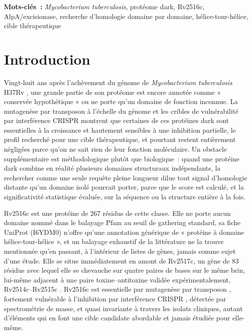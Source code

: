 \documentclass[11pt,a4paper]{article}
\newcommand{\mtb}{\textit{Mycobacterium tuberculosis}}
\begin{document}
\textbf{Mots-cl\'es~:} \textit{Mycobacterium tuberculosis}, protéome dark, Rv2516c, AlpA/excisionase,
recherche d'homologie domaine par domaine, hélice-tour-hélice, cible thérapeutique

\section{Introduction}

Vingt-huit ans après l'achèvement du génome de \mtb{} H37Rv \citep{cole1998genome}, une grande
partie de son protéome est encore annotée comme « conservée hypothétique » ou ne porte qu'un
domaine de fonction inconnue. La mutagenèse par transposon à l'échelle du génome
\citep{dejesus2017essentiality} et les cribles de vulnérabilité par interférence CRISPR
\citep{bosch2021vulnerability} montrent que certaines de ces protéines dark sont essentielles à la
croissance et hautement sensibles à une inhibition partielle, le profil recherché pour une cible
thérapeutique, et pourtant restent entièrement négligées parce qu'on ne sait rien de leur fonction
moléculaire. Un obstacle supplémentaire est méthodologique plutôt que biologique~: quand une
protéine dark combine en réalité plusieurs domaines structuraux indépendants, la rechercher comme
une seule requête pleine longueur dilue tout signal d'homologie distante qu'un domaine isolé
pourrait porter, parce que le score est calculé, et la significativité statistique évaluée, sur la
séquence ou la structure entière à la fois.

Rv2516c est une protéine de 267 résidus de cette classe. Elle ne porte aucun domaine nommé dans le
balayage Pfam au seuil de gathering standard, sa fiche UniProt (I6YDM0) n'offre qu'une annotation
générique de « protéine à domaine hélice-tour-hélice », et un balayage exhaustif de la littérature
ne la trouve mentionnée qu'en passant, à l'intérieur de listes de gènes, jamais comme sujet d'une
étude. Elle se situe immédiatement en amont de Rv2517c, un gène de 83 résidus avec lequel elle se
chevauche sur quatre paires de bases sur le même brin, lui-même adjacent à une paire
toxine--antitoxine validée expérimentalement, Rv2514c--Rv2515c \citep{tandon2019ta}. Rv2516c est
essentielle par mutagenèse par transposon \citep{dejesus2017essentiality}, fortement vulnérable à
l'inhibition par interférence CRISPR \citep{bosch2021vulnerability}, détectée par spectrométrie de
masse, et quasi invariante à travers les isolats cliniques, autant d'éléments qui en font une
cible candidate abordable et jamais étudiée pour elle-même.
\end{document}
